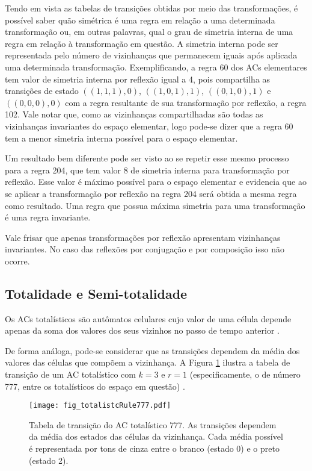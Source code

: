 Tendo em vista as tabelas de transições obtidas por meio das transformações, é possível saber quão simétrica é uma regra em relação a uma determinada transformação ou, em outras palavras, qual o grau de simetria interna de uma regra em relação à transformação em questão. A simetria interna pode ser representada pelo número de vizinhanças que permanecem iguais após aplicada uma determinada transformação. Exemplificando, a regra 60 dos ACs elementares tem valor de simetria interna por reflexão igual a 4, pois compartilha as transições de estado $((1,1,1),0)$, $((1,0,1),1)$, $((0,1,0),1)$ e $ ((0,0,0),0)$ com a regra resultante de sua transformação por reflexão, a regra 102. Vale notar que, como as vizinhanças compartilhadas são todas as vizinhanças invariantes do espaço elementar, logo pode-se dizer que a regra 60 tem a menor simetria interna possível para o espaço elementar.

Um resultado bem diferente pode ser visto ao se repetir esse mesmo processo para a regra 204, que tem valor 8 de simetria interna para transformação por reflexão. Esse valor é máximo possível para o espaço elementar e evidencia que ao se aplicar a transformação por reflexão na regra 204 será obtida a mesma regra como resultado. Uma regra que possua máxima simetria para uma transformação é uma regra invariante.

Vale frisar que apenas transformações por reflexão apresentam vizinhanças invariantes. No caso das reflexões por conjugação e por composição isso não ocorre.


\subsection{Totalidade e Semi-totalidade}
Os ACs totalísticos são autômatos celulares cujo valor de uma célula depende apenas da soma dos valores dos seus vizinhos no passo de tempo anterior \cite{wolfram1983statistical}.

De forma análoga, pode-se considerar que as transições dependem da média dos valores das células que compõem  a vizinhança. A Figura \ref{fig:totalistcRule} ilustra a tabela de transição de um AC totalístico com $k = 3$ e $r = 1$ (especificamente, o de número 777, entre os totalísticos do espaço em questão) \cite{wolfram2002new}.

	\begin{figure}[h!]
	  \centering
	  \texttt{[image: fig\_totalistcRule777.pdf]}
	  \caption{Tabela de transição do AC totalístico 777. As transições dependem da média dos estados das células da vizinhança. Cada média possível é representada por tons de cinza entre o branco (estado 0) e o preto (estado 2).}
	  \label{fig:totalistcRule}
	\end{figure}

